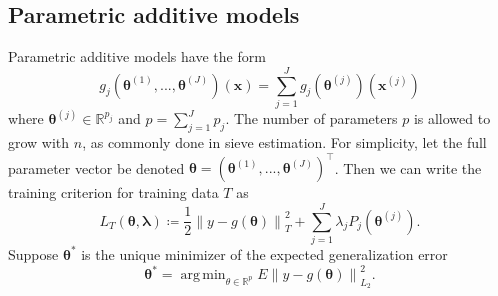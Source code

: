 \documentclass[12pt]{article} %
\theoremstyle{definition}
\DeclareMathOperator*{\argmin}{arg\,min}
\begin{document}
\subsection{Parametric additive models}
\label{sec:param_add_models}
Parametric additive models have the form
\begin{equation}
g_j(\boldsymbol{\theta}^{(1)}, ..., \boldsymbol{\theta}^{(J)})(\boldsymbol{x})
= \sum_{j=1}^J g_j(\boldsymbol{\theta}^{(j)})(\boldsymbol{x}^{(j)})
\end{equation}
where $\boldsymbol{\theta}^{(j)} \in \mathbb{R}^{p_j}$ and $p = \sum_{j=1}^J p_j$. The number of parameters $p$ is allowed to grow with $n$, as commonly done in sieve estimation. For simplicity, let the full parameter vector be denoted $\boldsymbol{\theta} = \left (\boldsymbol{\theta}^{(1)}, ..., \boldsymbol{\theta}^{(J)} \right )^\top$. Then we can write the training criterion for training data $T$ as
\begin{equation}
\label{eq:param_add}
L_T \left (\boldsymbol{\theta}, \boldsymbol{\lambda} \right) 
\coloneqq \frac{1}{2} \left  \| y -  g(\boldsymbol{\theta}) \right \|^2_T 
+ \sum_{j=1}^J \lambda_j P_j(\boldsymbol{\theta}^{(j)}).
\end{equation}
Suppose $\boldsymbol{\theta}^*$ is the unique minimizer of the expected generalization error
\begin{equation}
\boldsymbol{\theta}^*
= \argmin_{\theta \in \mathbb{R}^p} E \left \| y - g(\boldsymbol{\theta}) \right\|^2_{L_2}.
\end{equation}
\end{document}
